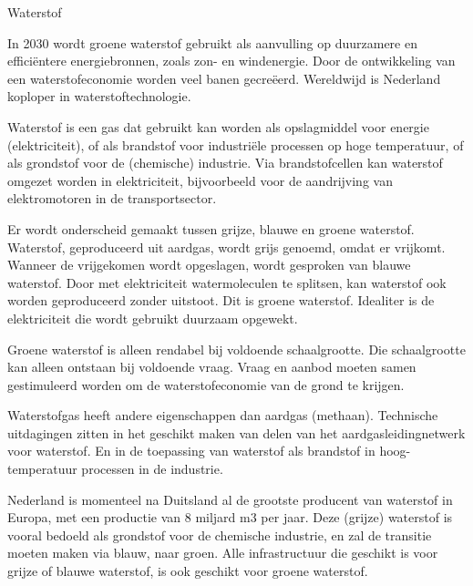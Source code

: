 \begin{voorstel}{Waterstof}


\begin{samenvatting}
In 2030 wordt groene waterstof gebruikt als aanvulling op duurzamere en efficiëntere energiebronnen, zoals zon- en windenergie. Door de ontwikkeling van een waterstofeconomie worden veel banen gecreëerd. Wereldwijd is Nederland koploper in waterstoftechnologie.
\end{samenvatting}

\begin{multicols*}{2}

\begin{uitdaging}
Waterstof is een gas dat gebruikt kan worden als opslagmiddel voor energie (elektriciteit), of als brandstof voor industriële processen op hoge temperatuur, of als grondstof voor de (chemische) industrie. Via brandstofcellen kan waterstof omgezet worden in elektriciteit, bijvoorbeeld voor de aandrijving van elektromotoren in de transportsector. 

Er wordt onderscheid gemaakt tussen grijze, blauwe en groene waterstof. Waterstof, geproduceerd uit aardgas, wordt grijs genoemd, omdat er \COO vrijkomt. Wanneer de vrijgekomen \COO wordt opgeslagen, wordt gesproken van blauwe waterstof. Door met elektriciteit watermoleculen te splitsen, kan waterstof ook worden geproduceerd zonder \COO uitstoot. Dit is groene waterstof. Idealiter is de elektriciteit die wordt gebruikt duurzaam opgewekt.

Groene waterstof is alleen rendabel bij voldoende schaalgrootte. Die schaalgrootte kan alleen ontstaan bij voldoende vraag. Vraag en aanbod moeten samen gestimuleerd worden om de waterstofeconomie van de grond te krijgen.

Waterstofgas heeft andere eigenschappen dan aardgas (methaan). Technische uitdagingen zitten in het geschikt maken van delen van het aardgasleidingnetwerk voor waterstof. En in de toepassing van waterstof als brandstof in hoog-temperatuur processen in de industrie.
\end{uitdaging}

\begin{overwegingen}
Nederland is momenteel na Duitsland al de grootste producent van waterstof in Europa, met een productie van 8 miljard m3 per jaar. Deze (grijze) waterstof is vooral bedoeld als grondstof voor de chemische industrie, en zal de transitie moeten maken via blauw, naar groen. Alle infrastructuur die geschikt is voor grijze of blauwe waterstof, is ook geschikt voor groene waterstof.


\end{overwegingen}
\end{multicols*}
\end{voorstel}
